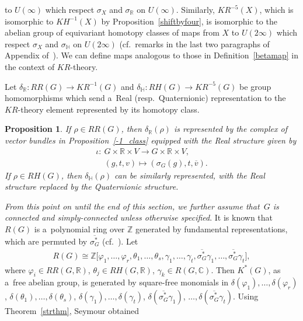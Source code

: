 \documentclass[11pt]{article}
\numberwithin{equation}{section}
\newtheorem{Proposition}[Theorem]{Proposition}
{\theoremstyle{definition}
\newtheorem{Definition}[Theorem]{Definition}
\newtheorem{Example}[Theorem]{Example}
\newtheorem{Remark}[Theorem]{Remark}
}
\begin{document}
to $U(\infty)$ which respect $\sigma_X$ and $\sigma_\mathbb{R}$ on $U(\infty)$.
Similarly, $KR^{-5}(X)$, which is isomorphic to $KH^{-1}(X)$ by Proposition~\ref{shiftbyfour}, is isomorphic to the
abelian group of equivariant homotopy classes of maps from $X$ to $U(2\infty)$
which respect $\sigma_X$ and $\sigma_\mathbb{H}$ on $U(2\infty)$
(cf.\ remarks in the last two paragraphs of Appendix of~\cite{Se}).
We can def\/ine maps analogous to those in Def\/inition~\ref{betamap} in the context of $KR$-theory.
\begin{Definition}
Let $\delta_\mathbb{R}: RR(G)\to KR^{-1}(G)$ and $\delta_\mathbb{H}: RH(G)\to KR^{-5}(G)$ be group homomorphisms which
send a~Real (resp.\
Quaternionic) representation to the $KR$-theory element represented by its homotopy class.
\end{Definition}
\begin{Proposition}
If $\rho\in RR(G)$, then $\delta_\mathbb{R}(\rho)$ is represented by the complex of vector bundles in
Proposition~{\rm \ref{-1_class}} equipped with the Real structure given by
\begin{gather*}
\iota: \ G\times\mathbb{R}\times V  \to  G\times\mathbb{R}\times V,
\\
\phantom{\iota: {}} \
(g, t, v)  \mapsto  (\sigma_G(g), t, \overline{v}).
\end{gather*}
If $\rho\in RH(G)$, then $\delta_\mathbb{H}(\rho)$ can be similarly represented, with the Real structure replaced by the
Quaternionic structure.
\end{Proposition}

\emph{From this point on until the end of this section, we further assume that~$G$ is connected and simply-connected unless
otherwise specified}.
It is known that $R(G)$ is a~polynomial ring over $\mathbb{Z}$ generated by fundamental representations, which are
permuted by $\overline{\sigma_{G}^*}$ (cf.\ \cite[Lemma~5.5]{Se}).
Let
\begin{gather*}
R(G)\cong\mathbb{Z}\big[\varphi_1, \dots, \varphi_r, \theta_1, \dots, \theta_s, \gamma_1, \dots, \gamma_t, \overline{\sigma_G^*}
\gamma_1, \dots, \overline{\sigma_G^*}\gamma_t\big],
\end{gather*}
where $\varphi_i\in RR(G, \mathbb{R})$, $\theta_j\in RH(G, \mathbb{R})$, $\gamma_k\in R(G, \mathbb{C})$.
Then $K^*(G)$, as a~free abelian group, is generated by square-free monomials
in $\delta(\varphi_1), {\dots},\delta(\varphi_r)$,
$\delta(\theta_1), {\dots}, \delta(\theta_s)$,
$\delta(\gamma_1), {\dots}, \delta(\gamma_t)$,
$\delta(\overline{\sigma_G^*}\gamma_1)$, ${\dots}, \delta(\overline{\sigma_G^*}\gamma_t)$.
Using Theorem~\ref{strthm}, Seymour obtained
\end{document}
